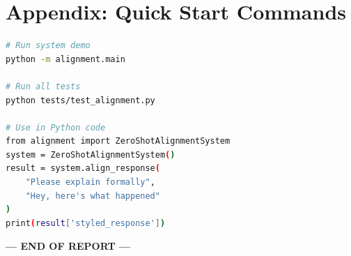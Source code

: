 \documentclass[11pt,a4paper]{article}
\begin{document}
\section*{Appendix: Quick Start Commands}

\begin{lstlisting}[language=bash]
# Run system demo
python -m alignment.main

# Run all tests
python tests/test_alignment.py

# Use in Python code
from alignment import ZeroShotAlignmentSystem
system = ZeroShotAlignmentSystem()
result = system.align_response(
    "Please explain formally",
    "Hey, here's what happened"
)
print(result['styled_response'])
\end{lstlisting}

\vspace{1cm}

\begin{center}
\textbf{--- END OF REPORT ---}
\end{center}
\end{document}
